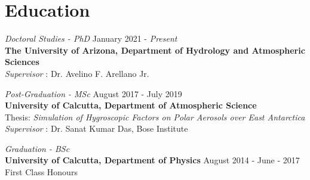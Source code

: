 \documentclass[margin,line]{resume}
\begin{document}
\begin{resume}
{		}
		
		\vspace*{-3mm}
		
		
		
		\section{\mysidestyle \textbf{\textcolor{sep}{Education}}}
		
		\emph{Doctoral Studies - PhD} \hfill January 2021 - \textit{Present}\\
		\textbf{The University of Arizona, Department of Hydrology and Atmospheric Sciences} \\
		\textit{Supervisor} : Dr. Avelino F. Arellano Jr.
		
		\emph{Post-Graduation - MSc} \hfill  August 2017 - July 2019\\
		\textbf{University of Calcutta, Department of Atmospheric Science} \\
		\footnotesize
		\normalsize
		Thesis: \emph{Simulation of Hygroscopic Factors on Polar Aerosols over East Antarctica} \\
		\textit{Supervisor} : Dr. Sanat Kumar Das, Bose Institute
		
		\emph{Graduation - BSc}\\
		\textbf{University of Calcutta, Department of Physics}	\hfill August 2014 - June - 2017\\
		First Class Honours 
		
		\vspace*{-3mm}
		

\end{resume}
\end{document}
